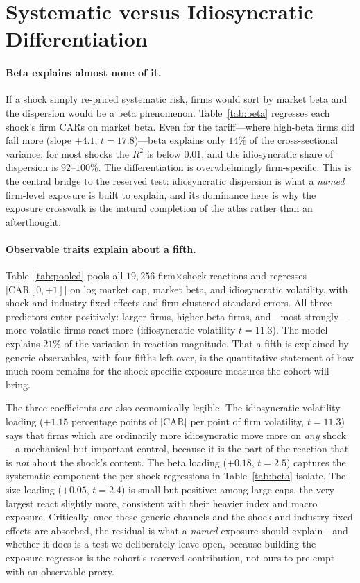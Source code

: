 \documentclass[12pt]{article}
\begin{document}
\section{Systematic versus Idiosyncratic Differentiation}\label{sec:beta}
\paragraph{Beta explains almost none of it.} If a shock simply re-priced systematic risk, firms
would sort by market beta and the dispersion would be a beta phenomenon. Table~\ref{tab:beta}
regresses each shock's firm CARs on market beta. Even for the tariff---where high-beta firms did
fall more (slope $+4.1$, $t=17.8$)---beta explains only $14\%$ of the cross-sectional variance;
for most shocks the $R^2$ is below $0.01$, and the idiosyncratic share of dispersion is $92$--$100\%$.
The differentiation is overwhelmingly firm-specific. This is the central bridge to the reserved
test: idiosyncratic dispersion is what a \emph{named} firm-level exposure is built to explain, and
its dominance here is why the exposure crosswalk is the natural completion of the atlas rather than
an afterthought.

\paragraph{Observable traits explain about a fifth.} Table~\ref{tab:pooled} pools all $19{,}256$
firm$\times$shock reactions and regresses $|\text{CAR}[0,+1]|$ on log market cap, market beta, and
idiosyncratic volatility, with shock and industry fixed effects and firm-clustered standard errors.
All three predictors enter positively: larger firms, higher-beta firms, and---most strongly---more
volatile firms react more (idiosyncratic volatility $t=11.3$). The model explains $21\%$ of the
variation in reaction magnitude. That a fifth is explained by generic observables, with four-fifths
left over, is the quantitative statement of how much room remains for the shock-specific exposure
measures the cohort will bring.

The three coefficients are also economically legible. The idiosyncratic-volatility loading
($+1.15$ percentage points of $|\text{CAR}|$ per point of firm volatility, $t=11.3$) says that
firms which are ordinarily more idiosyncratic move more on \emph{any} shock---a mechanical but
important control, because it is the part of the reaction that is \emph{not} about the shock's
content. The beta loading ($+0.18$, $t=2.5$) captures the systematic component the per-shock
regressions in Table~\ref{tab:beta} isolate. The size loading ($+0.05$, $t=2.4$) is small but
positive: among large caps, the very largest react slightly more, consistent with their heavier
index and macro exposure. Critically, once these generic channels and the shock and industry fixed
effects are absorbed, the residual is what a \emph{named} exposure should explain---and whether it
does is a test we deliberately leave open, because building the exposure regressor is the cohort's
reserved contribution, not ours to pre-empt with an observable proxy.
\end{document}
